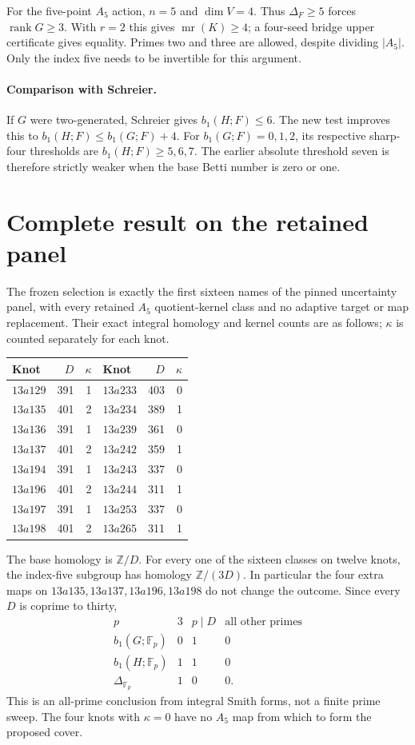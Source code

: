 \documentclass[11pt]{article}
\newcommand{\mr}{\operatorname{mr}}
\newcommand{\rk}{\operatorname{rank}}
\newcommand{\F}{\mathbb F}
\newcommand{\Z}{\mathbb Z}
\begin{document}
For the five-point $A_5$ action, $n=5$ and $\dim V=4$. Thus
$\Delta_F\ge5$ forces $\rk G\ge3$. With $r=2$ this gives
$\mr(K)\ge4$; a four-seed bridge upper certificate gives equality.
Primes two and three are allowed, despite dividing $|A_5|$.
Only the index five needs to be invertible for this argument.

\paragraph{Comparison with Schreier.}
If $G$ were two-generated, Schreier gives $b_1(H;F)\le6$.
The new test improves this to
$b_1(H;F)\le b_1(G;F)+4$.
For $b_1(G;F)=0,1,2$, its respective sharp-four thresholds are
$b_1(H;F)\ge5,6,7$. The earlier absolute threshold seven is therefore
strictly weaker when the base Betti number is zero or one.

\section{Complete result on the retained panel}

The frozen selection is exactly the first sixteen names of the pinned
uncertainty panel, with every retained $A_5$ quotient-kernel class and
no adaptive target or map replacement. Their exact integral homology
and kernel counts are as follows; $\kappa$ is counted separately for
each knot.
\begin{center}
\begin{tabular}{lrr|lrr}
\toprule
Knot & $D$ & $\kappa$ & Knot & $D$ & $\kappa$\\
\midrule
$13a129$&391&1&$13a233$&403&0\\
$13a135$&401&2&$13a234$&389&1\\
$13a136$&391&1&$13a239$&361&0\\
$13a137$&401&2&$13a242$&359&1\\
$13a194$&391&1&$13a243$&337&0\\
$13a196$&401&2&$13a244$&311&1\\
$13a197$&391&1&$13a253$&337&0\\
$13a198$&401&2&$13a265$&311&1\\
\bottomrule
\end{tabular}
\end{center}
The base homology is $\Z/D$. For every one of the sixteen classes
on twelve knots, the index-five subgroup has homology $\Z/(3D)$.
In particular the four extra maps on $13a135,13a137,13a196,13a198$
do not change the outcome. Since every $D$ is coprime to thirty,
\[
\begin{array}{c|ccc}
 p&3&p\mid D&\text{all other primes}\\\hline
 b_1(G;\F_p)&0&1&0\\
 b_1(H;\F_p)&1&1&0\\
 \Delta_{\F_p}&1&0&0.
\end{array}
\]
This is an all-prime conclusion from integral Smith forms, not a
finite prime sweep. The four knots with $\kappa=0$ have no $A_5$
map from which to form the proposed cover.
\end{document}
